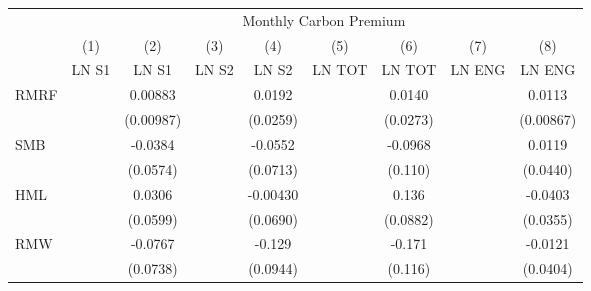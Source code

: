 {
\def\sym#1{\ifmmode^{#1}\else\(^{#1}\)\fi}
\begin{tabular}{l*{8}{c}}
\hline\hline
                    &\multicolumn{8}{c}{Monthly Carbon Premium}                                                                                                                                     \\\cmidrule(lr){2-9}
                    &\multicolumn{1}{c}{(1)}&\multicolumn{1}{c}{(2)}&\multicolumn{1}{c}{(3)}&\multicolumn{1}{c}{(4)}&\multicolumn{1}{c}{(5)}&\multicolumn{1}{c}{(6)}&\multicolumn{1}{c}{(7)}&\multicolumn{1}{c}{(8)}\\
                    &\multicolumn{1}{c}{LN S1}&\multicolumn{1}{c}{LN S1}&\multicolumn{1}{c}{LN S2}&\multicolumn{1}{c}{LN S2}&\multicolumn{1}{c}{LN TOT}&\multicolumn{1}{c}{LN TOT}&\multicolumn{1}{c}{LN ENG}&\multicolumn{1}{c}{LN ENG}\\
\hline
RMRF                &                     &     0.00883         &                     &      0.0192         &                     &      0.0140         &                     &      0.0113         \\
                    &                     &   (0.00987)         &                     &    (0.0259)         &                     &    (0.0273)         &                     &   (0.00867)         \\
SMB                 &                     &     -0.0384         &                     &     -0.0552         &                     &     -0.0968         &                     &      0.0119         \\
                    &                     &    (0.0574)         &                     &    (0.0713)         &                     &     (0.110)         &                     &    (0.0440)         \\
HML                 &                     &      0.0306         &                     &    -0.00430         &                     &       0.136         &                     &     -0.0403         \\
                    &                     &    (0.0599)         &                     &    (0.0690)         &                     &    (0.0882)         &                     &    (0.0355)         \\
RMW                 &                     &     -0.0767         &                     &      -0.129         &                     &      -0.171         &                     &     -0.0121         \\
                    &                     &    (0.0738)         &                     &    (0.0944)         &                     &     (0.116)         &                     &    (0.0404)         \\

\end{tabular}}
